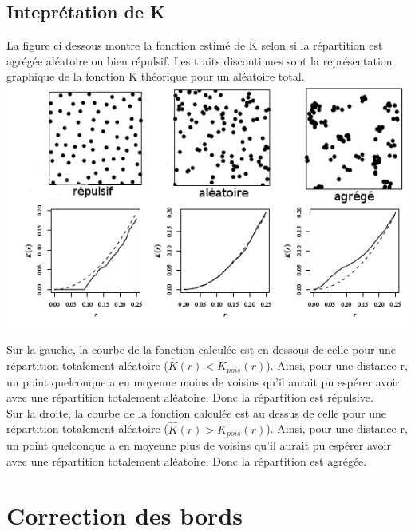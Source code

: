 \documentclass[french,12pt,a4paper]{report}
\begin{document}

\subsection{Inteprétation de K}
La figure ci dessous montre la fonction estimé de K selon si la répartition est agrégée aléatoire ou bien répulsif. Les traits discontinues sont la représentation graphique de la fonction K théorique pour un aléatoire total.\\

\includegraphics[scale=0.7]{images/interpret3.png}

Sur la gauche, la courbe de la fonction calculée est en dessous de celle pour une répartition totalement aléatoire (\begin{math}\hat{K}(r) < K_{pois}(r) \end{math}). Ainsi, pour une distance r, un point quelconque a en moyenne moins de voisins qu'il aurait pu espérer avoir avec une répartition totalement aléatoire. Donc la répartition est répulsive.\\
\indent
Sur la droite, la courbe de la fonction calculée est au dessus de celle pour une répartition totalement aléatoire (\begin{math}\hat{K}(r) > K_{pois}(r) \end{math}). Ainsi, pour une distance r, un point quelconque a en moyenne plus de voisins qu'il aurait pu espérer avoir avec une répartition totalement aléatoire. Donc la répartition est agrégée.\\


\section{Correction des bords}
\end{document}
